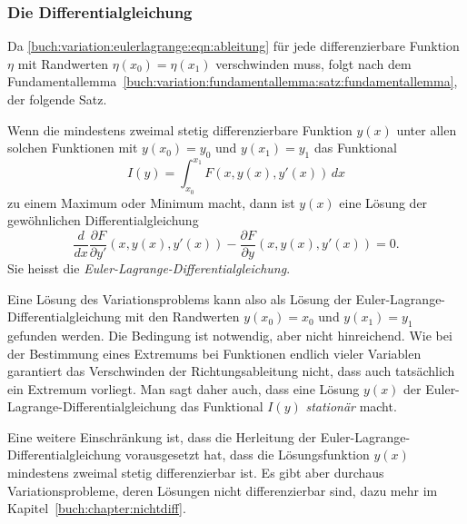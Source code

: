 %
%
\subsubsection{Die Differentialgleichung}
Da
\eqref{buch:variation:eulerlagrange:eqn:ableitung}
für jede differenzierbare Funktion $\eta$ mit Randwerten
$\eta(x_0)=\eta(x_1)$ verschwinden muss, folgt nach dem
Fundamentallemma~\ref{buch:variation:fundamentallemma:satz:fundamentallemma},
der folgende Satz. 

\begin{satz}
\label{buch:variation:eulerlagrange:satz:eulerlagrange}
Wenn die mindestens zweimal stetig differenzierbare Funktion $y(x)$
unter allen solchen Funktionen mit $y(x_0)=y_0$ und $y(x_1)=y_1$
das Funktional
\[
I(y)
=
\int_{x_0}^{x_1}
F(x,y(x),y'(x))\,dx
\]
zu einem Maximum oder Minimum macht, dann ist $y(x)$ eine Lösung der
gewöhnlichen Differentialgleichung
\begin{equation}
\frac{d}{dx}
\frac{\partial F}{\partial y'}(x,y(x),y'(x))
-
\frac{\partial F}{\partial y}(x,y(x),y'(x))
=
0.
\label{buch:variation:eulerlagrange:eqn:eulerlagrange}
\end{equation}
Sie heisst die {\em Euler-Lagrange-Differentialgleichung}.
\end{satz}

Eine Lösung des Variationsproblems kann also als Lösung der
Euler-Lagrange-Dif\-fe\-ren\-tial\-glei\-chung mit den Randwerten
$y(x_0)=x_0$ und $y(x_1)=y_1$ gefunden werden.
Die Bedingung ist notwendig, aber nicht hinreichend.
Wie bei der Bestimmung eines Extremums bei Funktionen endlich
vieler Variablen garantiert das Verschwinden der Richtungsableitung
nicht, dass auch tatsächlich ein Extremum vorliegt.
Man sagt daher auch, dass eine Lösung $y(x)$ der
Euler-Lagrange-Differentialgleichung das Funktional $I(y)$
{\em stationär} macht.

Eine weitere Einschränkung ist, dass die Herleitung der
Euler-Lagrange-Differential\-gleichung vorausgesetzt hat,
dass die Lösungsfunktion $y(x)$ mindestens zweimal 
stetig differenzierbar ist.
Es gibt aber durchaus Variationsprobleme, deren Lösungen
nicht differenzierbar sind, dazu mehr im Kapitel~\ref{buch:chapter:nichtdiff}.

